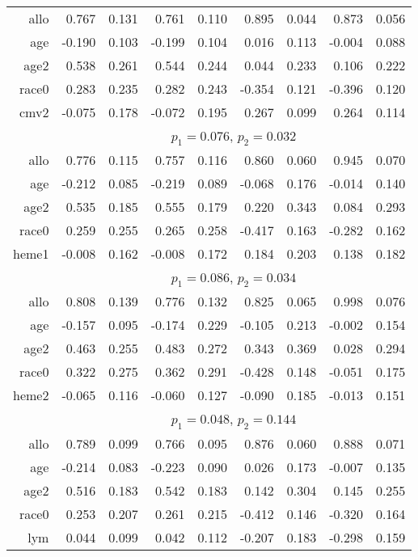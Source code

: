 \documentclass[a4paper,10pt]{article}
\begin{document}
\begin{table}[ht]
\begin{tabular}{rrrrrrrrr}
    allo & 0.767 & 0.131 & 0.761 & 0.110 & 0.895 & 0.044 & 0.873 & 0.056 \\ 
    age & -0.190 & 0.103 & -0.199 & 0.104 & 0.016 & 0.113 & -0.004 & 0.088 \\ 
    age2 & 0.538 & 0.261 & 0.544 & 0.244 & 0.044 & 0.233 & 0.106 & 0.222 \\ 
    race0 & 0.283 & 0.235 & 0.282 & 0.243 & -0.354 & 0.121 & -0.396 & 0.120 \\ 
    cmv2 & -0.075 & 0.178 & -0.072 & 0.195 & 0.267 & 0.099 & 0.264 & 0.114 \\ 
    [1ex]
    & \multicolumn{8}{c}{$p_1 = 0.076$, $p_2 = 0.032$}\\
    allo & 0.776 & 0.115 & 0.757 & 0.116 & 0.860 & 0.060 & 0.945 & 0.070 \\ 
    age & -0.212 & 0.085 & -0.219 & 0.089 & -0.068 & 0.176 & -0.014 & 0.140 \\ 
    age2 & 0.535 & 0.185 & 0.555 & 0.179 & 0.220 & 0.343 & 0.084 & 0.293 \\ 
    race0 & 0.259 & 0.255 & 0.265 & 0.258 & -0.417 & 0.163 & -0.282 & 0.162 \\ 
    heme1 & -0.008 & 0.162 & -0.008 & 0.172 & 0.184 & 0.203 & 0.138 & 0.182 \\ 
    [1ex]
    & \multicolumn{8}{c}{$p_1 = 0.086$, $p_2 = 0.034$}\\
    allo & 0.808 & 0.139 & 0.776 & 0.132 & 0.825 & 0.065 & 0.998 & 0.076 \\ 
    age & -0.157 & 0.095 & -0.174 & 0.229 & -0.105 & 0.213 & -0.002 & 0.154 \\ 
    age2 & 0.463 & 0.255 & 0.483 & 0.272 & 0.343 & 0.369 & 0.028 & 0.294 \\ 
    race0 & 0.322 & 0.275 & 0.362 & 0.291 & -0.428 & 0.148 & -0.051 & 0.175 \\ 
    heme2 & -0.065 & 0.116 & -0.060 & 0.127 & -0.090 & 0.185 & -0.013 & 0.151 \\ 
    [1ex]
    & \multicolumn{8}{c}{$p_1 = 0.048$, $p_2 = 0.144$}\\
    allo & 0.789 & 0.099 & 0.766 & 0.095 & 0.876 & 0.060 & 0.888 & 0.071 \\ 
    age & -0.214 & 0.083 & -0.223 & 0.090 & 0.026 & 0.173 & -0.007 & 0.135 \\ 
    age2 & 0.516 & 0.183 & 0.542 & 0.183 & 0.142 & 0.304 & 0.145 & 0.255 \\ 
    race0 & 0.253 & 0.207 & 0.261 & 0.215 & -0.412 & 0.146 & -0.320 & 0.164 \\ 
    lym & 0.044 & 0.099 & 0.042 & 0.112 & -0.207 & 0.183 & -0.298 & 0.159 \\ 

\end{tabular}
\end{table}
\end{document}
